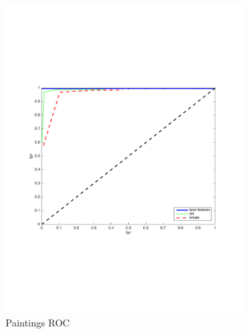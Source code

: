 \documentclass[english,12pt,a4paper,pdftex,elec,utf8, table]{aaltothesis}
\begin{document}
\begin{figure}[htb]
  \begin{center}
  \begin{subfigure}[b]{0.49\textwidth}
    \includegraphics[width=\textwidth]{figures/NormalizehistogramROC.pdf}
    \caption{Paintings ROC}
    \label{Normalizeroc}
  \end{subfigure}
  \begin{subfigure}[b]{0.49\textwidth}

\end{subfigure}
\end{center}
\end{figure}
\end{document}
